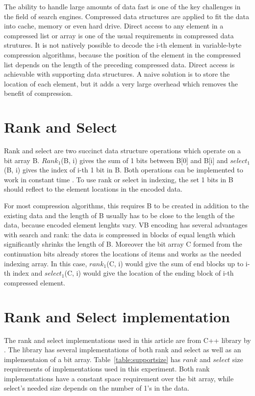 The ability to handle large amounts of data fast is one of the key challenges in the field of search engines. Compressed data structures are applied to fit the 
data into cache, memory or even hard drive. Direct access to any element in a compressed list or array is one of the usual requirements in compressed data 
strutures. It is not natively possible to decode the i-th element in variable-byte compression algorithms, because the position of the element in the compressed
list depends on the length of the preceding compressed data. Direct access is achievable with supporting data structures. A naive solution is to store the location 
of each element, but it adds a very large overhead which removes the benefit of compression.

\section{Rank and Select}
Rank and select are two succinct data structure operations which operate on a bit array B. $Rank_1$(B, i) gives the sum of 1 bits between B[0] and B[i] and 
$select_1$(B, i) gives the index of i-th 1 bit in B. Both operations can be implemented to work in constant time \citep{gbmp2014sea}. To use rank or select in indexing, the
set 1 bits in B should reflect to the element locations in the encoded data. 

For most compression algorithms, this requires B to be created in addition to the existing data and the length of B usually 
has to be close to the length of the data, because encoded element lenghts vary. VB encoding has several advantages with search and rank: the data is compressed in 
blocks of equal length which significantly shrinks the length of B. Moreover the bit array C formed from the continuation bits already stores the locations of items and works
as the needed indexing array. In this case, $rank_1$(C, i) would give the sum of end blocks up to i-th index and $select_1$(C, i) would give the location of the ending block 
of i-th compressed element.

\section{Rank and Select implementation}

The rank and select implementations used in this article are from C++ library by \citep{gbmp2014sea}. The library has several implementations of both rank and 
select as well as an implementaion of a bit array. Table~\ref{table:supportsize} has $rank$ and $select$ size requirements of implementations used in this experiment.
Both rank implementations have a constant space requirement over the bit array, while select's needed size depends on the number of 1's in the data.


